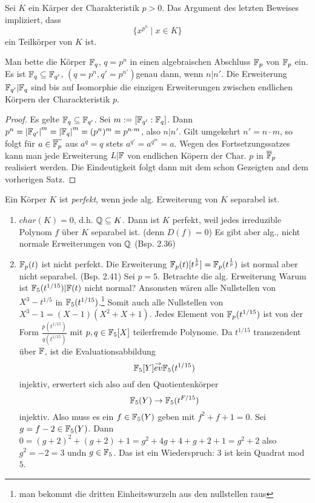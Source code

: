 \documentclass[../main.tex]{subfiles}
\begin{document}
\begin{remark}
    Sei $K$ ein Kärper der Charakteristik $p>0$.
    Das Argument des letzten Beweises impliziert, dass $$\{x^{p^n}\mid x\in K\}$$ ein Teilkörper von $K$ ist.
\end{remark}
\begin{corollary}
    Man bette die Körper $\mathbb{F}_q$, $ q=p^n$ in einen algebraischen Abschluss $\mathbb{F}_p$ von $\mathbb{F}_p$ ein.
    Es ist $\mathbb{F}_q \subseteq \mathbb{F}_{q'}$, $(q = p^n, q'=p^{n'})$genau dann, wenn $n|n'$.
    Die Erweiterung $\mathbb{F}_{q'}|\mathbb{F}_q$ sind bis auf Isomorphie die einzigen Erweiterungen zwischen endlichen Körpern der Charackteristik $p$.
\end{corollary}
\begin{proof}
    Es gelte $\mathbb{F}_q \subseteq \mathbb{F}_{q'}$. Sei $m:= [\mathbb{F}_{q'}:\mathbb{F}_q]$. Dann $p^n = \left\vert  \mathbb{F}_{q'} \right\vert^m = \left\vert \mathbb{F}_q \right\vert^m = (p^n)^m = p^{n\cdot m}$, also $n|n'$.
    Gilt umgekehrt $n'=n\cdot m$, so folgt für $a\in \overline{\mathbb{F}_p}$ aus $a^q=q$ stets $a^{q'}=a^{q^m} = a$.
    Wegen des Fortsetzungssatzes kann man jede Erweiterung $L|\mathbb{F}$ von endlichen Köpern der Char. $p$ in $\overline{\mathbb{F}}_p$ realisiert werden.
    Die Eindeutigkeit folgt dann mit dem schon Gezeigten and  dem vorherigen Satz.
\end{proof}
Ein Körper $K$ ist \emph{perfekt}, wenn jede alg. Erweiterung von $K$ separabel ist.
\begin{enumerate} %
    \item $char(K)=0$, d.h. $\mathbb{Q} \subseteq K$. Dann ist $K$ perfekt, weil jedes irreduzible Polynom $f$ über $K$ separabel ist. (denn $D(f) = 0$) Es gibt aber alg., nicht normale Erweiterungen von $\mathbb{Q}$ (Bsp. 2.36)
    \item $\mathbb{F}_p(t)$ ist nicht perfekt. Die Erweiterung $\mathbb{F}_p(t)[t^{\frac{1}{p}}] = \mathbb{F}_p(t^{\frac{1}{p}})$ ist normal aber nicht separabel. (Bsp. 2.41)
    Sei $p=5$. Betrachte die alg. Erweiterung
    \TODO[bild]
    Warum ist $\mathbb{F}_5(t^{1/15})|\mathbb{F}(t)$ nicht normal?
    Ansonsten wären alle Nullstellen von $X^3-t^{1/5}$ in $\mathbb{F}_5(t^{1/15})$.\footnote{man bekommt die dritten Einheitswurzeln aus den nullstellen raus}
    Somit auch alle Nullstellen von $X^3-1= (X-1)(X^2+X+1)$.
    Jedes Element von $\mathbb{F}_p(t^{1/15})$ ist von der Form $\frac{p(t^{1/15})}{q(t^{1/15})}$ mit $p,q \in \mathbb{F}_5[X]$ teilerfremde Polynome.
    Da $t^{1/15}$ transzendent über $\mathbb{F}$, ist die Evaluationsabbildung $$\mathbb{F}_5[Y]\overset{\rightarrow}{ev} \mathbb{F}_5(t^{1/15})$$ injektiv, erwertert sich also auf den Quotientenkörper $$\mathbb{F}_5(Y)\rightarrow \mathbb{F}_5(t^{F/15})$$ injektiv.
    Also muss es ein $f\in \mathbb{F}_5(Y)$ geben mit $f^2+f+1=0$.
    Sei $g=f-2\in \mathbb{F}_5(Y)$.
    Dann $0=(g+2)^2+(g+2)+1 = g^2 +4g+4+g+2+1= g^2 +2$ also $g^2=-2=3$ undn $g\in \mathbb{F}_5$.
    Das ist ein Wiederspruch: $3$ ist kein Quadrat mod $5$.
\end{enumerate}
\end{document}
